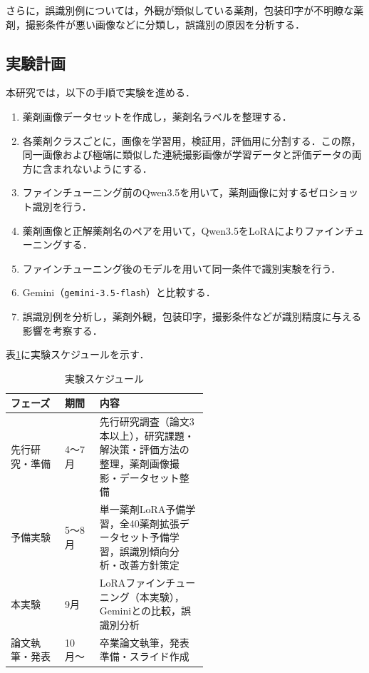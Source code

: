 \documentclass{jsarticle}
\begin{document}
さらに，誤識別例については，外観が類似している薬剤，包装印字が不明瞭な薬剤，撮影条件が悪い画像などに分類し，誤識別の原因を分析する．

\subsection{実験計画}

本研究では，以下の手順で実験を進める．

\begin{enumerate}
  \item 薬剤画像データセットを作成し，薬剤名ラベルを整理する．
  \item 各薬剤クラスごとに，画像を学習用，検証用，評価用に分割する．この際，同一画像および極端に類似した連続撮影画像が学習データと評価データの両方に含まれないようにする．
  \item ファインチューニング前のQwen3.5を用いて，薬剤画像に対するゼロショット識別を行う．
  \item 薬剤画像と正解薬剤名のペアを用いて，Qwen3.5をLoRAによりファインチューニングする．
  \item ファインチューニング後のモデルを用いて同一条件で識別実験を行う．
  \item Gemini（\texttt{gemini-3.5-flash}）と比較する．
  \item 誤識別例を分析し，薬剤外観，包装印字，撮影条件などが識別精度に与える影響を考察する．
\end{enumerate}

表\ref{tab:schedule}に実験スケジュールを示す．

\begin{table}[h]
\centering
\caption{実験スケジュール}
\label{tab:schedule}
\begin{tabular}{llp{0.55\linewidth}}
\hline
フェーズ & 期間 & 内容 \\
\hline
先行研究・準備 & 4〜7月 & 先行研究調査（論文3本以上），研究課題・解決策・評価方法の整理，薬剤画像撮影・データセット整備 \\
予備実験       & 5〜8月 & 単一薬剤LoRA予備学習，全40薬剤拡張データセット予備学習，誤識別傾向分析・改善方針策定 \\
本実験         & 9月    & LoRAファインチューニング（本実験），Geminiとの比較，誤識別分析 \\
論文執筆・発表 & 10月〜 & 卒業論文執筆，発表準備・スライド作成 \\
\hline
\end{tabular}
\end{table}
\end{document}
